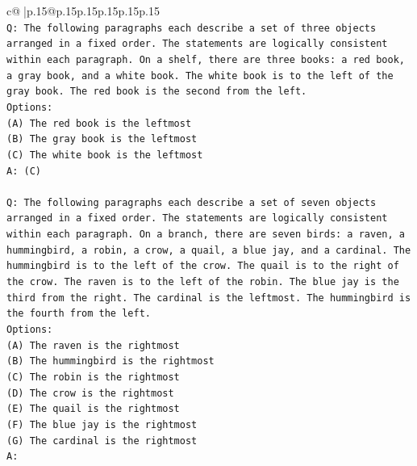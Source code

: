 \documentclass{article}
\begin{document}
{\begin{supertabular}{c@{$\;$}|p{.15\linewidth}@{}p{.15\linewidth}p{.15\linewidth}p{.15\linewidth}p{.15\linewidth}p{.15\linewidth}}
{{{\\ 
\texttt{Q: The following paragraphs each describe a set of three objects arranged in a fixed order. The statements are logically consistent within each paragraph. On a shelf, there are three books: a red book, a gray book, and a white book. The white book is to the left of the gray book. The red book is the second from the left.} \\
\texttt{Options:} \\
\texttt{(A) The red book is the leftmost} \\
\texttt{(B) The gray book is the leftmost} \\
\texttt{(C) The white book is the leftmost} \\
\texttt{A: (C)} \\
\\ 
\texttt{Q: The following paragraphs each describe a set of seven objects arranged in a fixed order. The statements are logically consistent within each paragraph. On a branch, there are seven birds: a raven, a hummingbird, a robin, a crow, a quail, a blue jay, and a cardinal. The hummingbird is to the left of the crow. The quail is to the right of the crow. The raven is to the left of the robin. The blue jay is the third from the right. The cardinal is the leftmost. The hummingbird is the fourth from the left.} \\
\texttt{Options:} \\
\texttt{(A) The raven is the rightmost} \\
\texttt{(B) The hummingbird is the rightmost} \\
\texttt{(C) The robin is the rightmost} \\
\texttt{(D) The crow is the rightmost} \\
\texttt{(E) The quail is the rightmost} \\
\texttt{(F) The blue jay is the rightmost} \\
\texttt{(G) The cardinal is the rightmost} \\
\texttt{A:} \\
            }
        }
    }
     \\ \\


\end{supertabular}}
\end{document}
